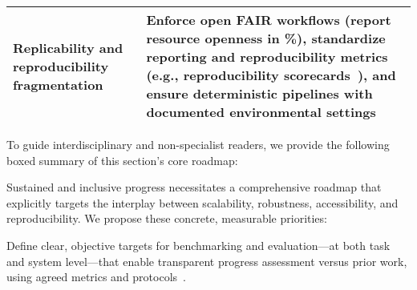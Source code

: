 \documentclass[sigconf]{acmart}
\begin{document}
\begin{table*}[htbp]
\begin{adjustbox}{max width=\textwidth}
\begin{tabular}{ll}
Replicability and reproducibility fragmentation & Enforce open FAIR workflows (report resource openness in \%), standardize reporting and reproducibility metrics (e.g., reproducibility scorecards~\cite{ref66,ref67}), and ensure deterministic pipelines with documented environmental settings \\
\bottomrule
\end{tabular}
\end{adjustbox}
\end{table*}

To guide interdisciplinary and non-specialist readers, we provide the following boxed summary of this section's core roadmap:

\noindent{}

Sustained and inclusive progress necessitates a comprehensive roadmap that explicitly targets the interplay between scalability, robustness, accessibility, and reproducibility. We propose these concrete, measurable priorities:

Define clear, objective targets for benchmarking and evaluation---at both task and system level---that enable transparent progress assessment versus prior work, using agreed metrics and protocols~\cite{ref10,ref17,ref34,ref101,ref102,ref104,ref105,ref106,ref107,ref108}.
\end{document}
